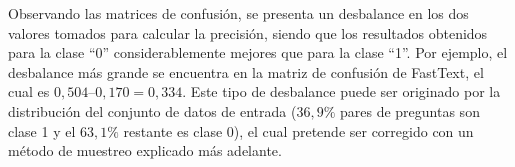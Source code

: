 \bigskip Observando las matrices de confusión, se presenta un desbalance en los dos valores tomados para calcular la precisión, siendo que los resultados obtenidos para la clase “0” considerablemente mejores que para la clase “1”. Por ejemplo, el desbalance más grande se encuentra en la matriz de confusión de FastText, el cual es \(0,504 – 0,170 = 0,334\). Este tipo de desbalance puede ser originado por la distribución del conjunto de datos de entrada (\(36,9\%\) pares de preguntas son clase 1 y el \(63,1\%\) restante es clase 0), el cual pretende ser corregido con un método de muestreo explicado más adelante.














